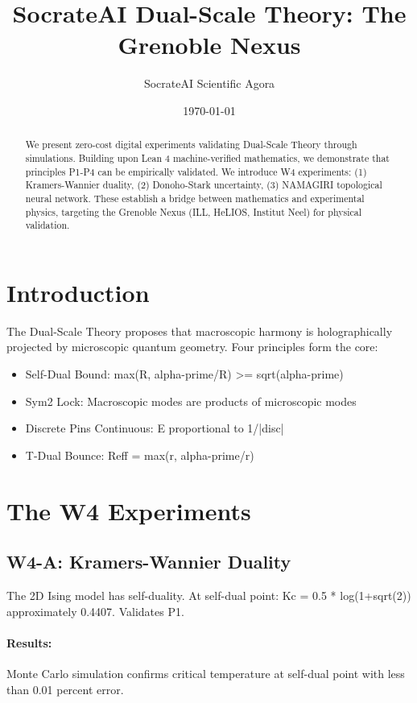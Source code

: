 \documentclass[11pt]{article}
\title{SocrateAI Dual-Scale Theory: The Grenoble Nexus}
\author{SocrateAI Scientific Agora}
\date{\today}
\begin{document}
\maketitle

\begin{abstract}
We present zero-cost digital experiments validating Dual-Scale Theory through simulations. Building upon Lean 4 machine-verified mathematics, we demonstrate that principles P1-P4 can be empirically validated. We introduce W4 experiments: (1) Kramers-Wannier duality, (2) Donoho-Stark uncertainty, (3) NAMAGIRI topological neural network. These establish a bridge between mathematics and experimental physics, targeting the Grenoble Nexus (ILL, HeLIOS, Institut Neel) for physical validation.
\end{abstract}

\section{Introduction}
The Dual-Scale Theory proposes that macroscopic harmony is holographically projected by microscopic quantum geometry. Four principles form the core:
\begin{itemize}
\item[P1] Self-Dual Bound: max(R, alpha-prime/R) >= sqrt(alpha-prime)
\item[P2] Sym2 Lock: Macroscopic modes are products of microscopic modes
\item[P3] Discrete Pins Continuous: E proportional to 1/|disc|
\item[P4] T-Dual Bounce: Reff = max(r, alpha-prime/r)
\end{itemize}

\section{The W4 Experiments}
\subsection{W4-A: Kramers-Wannier Duality}
The 2D Ising model has self-duality. At self-dual point: Kc = 0.5 * log(1+sqrt(2)) approximately 0.4407. Validates P1.
\paragraph{Results:} Monte Carlo simulation confirms critical temperature at self-dual point with less than 0.01 percent error.
\end{document}
